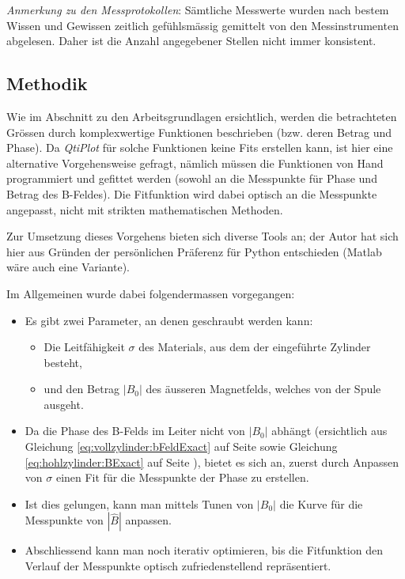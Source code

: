 \emph{Anmerkung  zu den  Messprotokollen}: S\"amtliche  Messwerte wurden  nach
bestem  Wissen  und  Gewissen  zeitlich gef\"uhlsm\"assig  gemittelt  von  den
Messinstrumenten  abgelesen. Daher ist  die Anzahl  angegebener Stellen  nicht
immer konsistent.


\subsection{Methodik}
\label{sec:ausw:subsec:methodik}

Wie im Abschnitt zu den Arbeitsgrundlagen ersichtlich, werden die betrachteten
Gr\"ossen durch  komplexwertige Funktionen beschrieben (bzw.  deren Betrag und
Phase). Da \emph{QtiPlot}  f\"ur solche Funktionen keine  Fits erstellen kann,
ist  hier  eine alternative  Vorgehensweise  gefragt,  n\"amlich m\"ussen  die
Funktionen von Hand programmiert und gefittet werden (sowohl an die Messpunkte
f\"ur Phase  und Betrag des  B-Feldes). Die Fitfunktion wird dabei  optisch an
die Messpunkte angepasst, nicht mit strikten mathematischen Methoden.

Zur  Umsetzung  dieses Vorgehens  bieten  sich  diverse  Tools an;  der  Autor
hat  sich  hier aus  Gr\"unden  der  pers\"onlichen Pr\"aferenz  f\"ur  Python
entschieden (Matlab w\"are auch eine Variante).

Im Allgemeinen wurde dabei folgendermassen vorgegangen:

\begin{itemize}
    \item
        Es gibt zwei Parameter, an denen geschraubt werden kann:
        \begin{itemize}
            \item
                Die  Leitf\"ahigkeit  $\sigma$  des  Materials,  aus  dem  der
                eingef\"uhrte Zylinder besteht,
            \item
                und den Betrag $|B_0|$ des \"ausseren Magnetfelds, welches von
                der Spule ausgeht.
        \end{itemize}
    \item
        Da   die   Phase   des   B-Felds   im   Leiter   nicht   von   $|B_0|$
        abh\"angt (ersichtlich  aus Gleichung \ref{eq:vollzylinder:bFeldExact}
        auf       Seite       \pageref{eq:vollzylinder:bFeldExact}       sowie
        Gleichung        \ref{eq:hohlzylinder:BExact}         auf        Seite
        \pageref{eq:hohlzylinder:BExact}),  bietet es  sich  an, zuerst  durch
        Anpassen  von $\sigma$  einen Fit  f\"ur die  Messpunkte der  Phase zu
        erstellen.
    \item
        Ist dies gelungen, kann man mittels  Tunen von $|B_0|$ die Kurve f\"ur
        die Messpunkte von $|\hat{B}|$ anpassen.
    \item
        Abschliessend kann  man noch iterativ optimieren,  bis die Fitfunktion
        den Verlauf der Messpunkte optisch zufriedenstellend repr\"asentiert.
\end{itemize}


